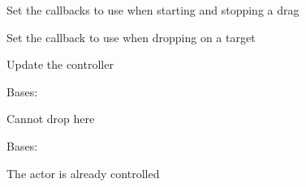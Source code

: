 \documentclass[letterpaper,10pt,english]{sphinxmanual}
\begin{document}
\begin{fulllineitems}
\begin{fulllineitems}
\label{blocks:serge.blocks.dragndrop.DragController.setCallbacks}
Set the callbacks to use when starting and stopping a drag

\end{fulllineitems}


\begin{fulllineitems}
\label{blocks:serge.blocks.dragndrop.DragController.setDropCallbacks}
Set the callback to use when dropping on a target

\end{fulllineitems}


\begin{fulllineitems}
\label{blocks:serge.blocks.dragndrop.DragController.updateActor}
Update the controller

\end{fulllineitems}


\end{fulllineitems}


\begin{fulllineitems}
\label{blocks:serge.blocks.dragndrop.DropNotAllowed}
Bases: 

Cannot drop here

\end{fulllineitems}


\begin{fulllineitems}
\label{blocks:serge.blocks.dragndrop.DuplicateActor}
Bases: 

The actor is already controlled

\end{fulllineitems}

\end{document}
